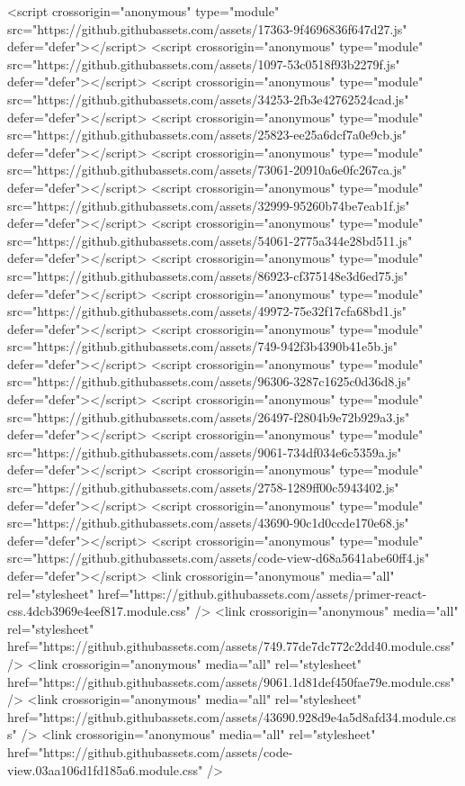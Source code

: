 <script crossorigin="anonymous" type="module" src="https://github.githubassets.com/assets/17363-9f4696836f647d27.js" defer="defer"></script>
<script crossorigin="anonymous" type="module" src="https://github.githubassets.com/assets/1097-53c0518f93b2279f.js" defer="defer"></script>
<script crossorigin="anonymous" type="module" src="https://github.githubassets.com/assets/34253-2fb3e42762524cad.js" defer="defer"></script>
<script crossorigin="anonymous" type="module" src="https://github.githubassets.com/assets/25823-ee25a6dcf7a0e9cb.js" defer="defer"></script>
<script crossorigin="anonymous" type="module" src="https://github.githubassets.com/assets/73061-20910a6e0fc267ca.js" defer="defer"></script>
<script crossorigin="anonymous" type="module" src="https://github.githubassets.com/assets/32999-95260b74be7eab1f.js" defer="defer"></script>
<script crossorigin="anonymous" type="module" src="https://github.githubassets.com/assets/54061-2775a344e28bd511.js" defer="defer"></script>
<script crossorigin="anonymous" type="module" src="https://github.githubassets.com/assets/86923-cf375148e3d6ed75.js" defer="defer"></script>
<script crossorigin="anonymous" type="module" src="https://github.githubassets.com/assets/49972-75e32f17cfa68bd1.js" defer="defer"></script>
<script crossorigin="anonymous" type="module" src="https://github.githubassets.com/assets/749-942f3b4390b41e5b.js" defer="defer"></script>
<script crossorigin="anonymous" type="module" src="https://github.githubassets.com/assets/96306-3287c1625c0d36d8.js" defer="defer"></script>
<script crossorigin="anonymous" type="module" src="https://github.githubassets.com/assets/26497-f2804b9e72b929a3.js" defer="defer"></script>
<script crossorigin="anonymous" type="module" src="https://github.githubassets.com/assets/9061-734df034e6c5359a.js" defer="defer"></script>
<script crossorigin="anonymous" type="module" src="https://github.githubassets.com/assets/2758-1289ff00c5943402.js" defer="defer"></script>
<script crossorigin="anonymous" type="module" src="https://github.githubassets.com/assets/43690-90c1d0ccde170e68.js" defer="defer"></script>
<script crossorigin="anonymous" type="module" src="https://github.githubassets.com/assets/code-view-d68a5641abe60ff4.js" defer="defer"></script>
<link crossorigin="anonymous" media="all" rel="stylesheet" href="https://github.githubassets.com/assets/primer-react-css.4dcb3969e4eef817.module.css" />
<link crossorigin="anonymous" media="all" rel="stylesheet" href="https://github.githubassets.com/assets/749.77de7dc772c2dd40.module.css" />
<link crossorigin="anonymous" media="all" rel="stylesheet" href="https://github.githubassets.com/assets/9061.1d81def450fae79e.module.css" />
<link crossorigin="anonymous" media="all" rel="stylesheet" href="https://github.githubassets.com/assets/43690.928d9e4a5d8afd34.module.css" />
<link crossorigin="anonymous" media="all" rel="stylesheet" href="https://github.githubassets.com/assets/code-view.03aa106d1fd185a6.module.css" />


